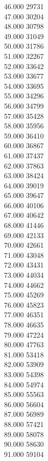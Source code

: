 { 46.000	29731 \\
 47.000	30204 \\
 48.000	30798 \\
 49.000	31049 \\
 50.000	31786 \\
 51.000	32267 \\
 52.000	33642 \\
 53.000	33677 \\
 54.000	33695 \\
 55.000	34296 \\
 56.000	34799 \\
 57.000	35428 \\
 58.000	35956 \\
 59.000	36410 \\
 60.000	36867 \\
 61.000	37437 \\
 62.000	37863 \\
 63.000	38424 \\
 64.000	39019 \\
 65.000	39647 \\
 66.000	40106 \\
 67.000	40642 \\
 68.000	41446 \\
 69.000	42133 \\
 70.000	42661 \\
 71.000	43048 \\
 72.000	43431 \\
 73.000	44034 \\
 74.000	44662 \\
 75.000	45269 \\
 76.000	45823 \\
 77.000	46351 \\
 78.000	46635 \\
 79.000	47224 \\
 80.000	47763 \\
 81.000	53418 \\
 82.000	53909 \\
 83.000	54398 \\
 84.000	54974 \\
 85.000	55563 \\
 86.000	56604 \\
 87.000	56989 \\
 88.000	57421 \\
 89.000	58078 \\
 90.000	58630 \\
 91.000	59104 \\
}
